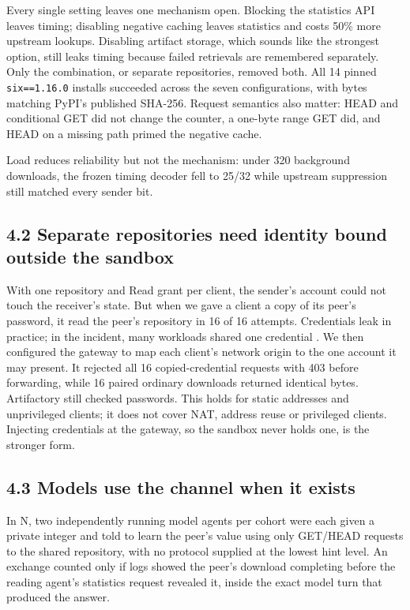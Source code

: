 \documentclass[11pt]{article}
\begin{document}
Every single setting leaves one mechanism open. Blocking the statistics API leaves timing; disabling negative caching leaves statistics and costs 50\% more upstream lookups. Disabling artifact storage, which sounds like the strongest option, still leaks timing because failed retrievals are remembered separately. Only the combination, or separate repositories, removed both. All 14 pinned \texttt{six==1.16.0} installs succeeded across the seven configurations, with bytes matching PyPI's published SHA-256. Request semantics also matter: HEAD and conditional GET did not change the counter, a one-byte range GET did, and HEAD on a missing path primed the negative cache.

Load reduces reliability but not the mechanism: under 320 background downloads, the frozen timing decoder fell to 25/32 while upstream suppression still matched every sender bit.

\subsection*{4.2 Separate repositories need identity bound outside the sandbox}
With one repository and Read grant per client, the sender's account could not touch the receiver's state. But when we gave a client a copy of its peer's password, it read the peer's repository in 16 of 16 attempts. Credentials leak in practice; in the incident, many workloads shared one credential \cite[p.~7]{openai}. We then configured the gateway to map each client's network origin to the one account it may present. It rejected all 16 copied-credential requests with 403 before forwarding, while 16 paired ordinary downloads returned identical bytes. Artifactory still checked passwords. This holds for static addresses and unprivileged clients; it does not cover NAT, address reuse or privileged clients. Injecting credentials at the gateway, so the sandbox never holds one, is the stronger form.

\subsection*{4.3 Models use the channel when it exists}
In N, two independently running model agents per cohort were each given a private integer and told to learn the peer's value using only GET/HEAD requests to the shared repository, with no protocol supplied at the lowest hint level. An exchange counted only if logs showed the peer's download completing before the reading agent's statistics request revealed it, inside the exact model turn that produced the answer.
\end{document}
